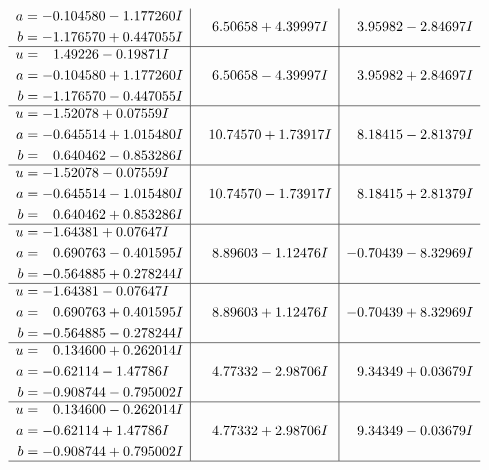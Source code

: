 \documentclass[1p]{elsarticle_modified}
\theoremstyle{definition}
\begin{document}
$$\begin{array}{c|c|c}
\begin{aligned}
a &= -0.104580 - 1.177260 I \\
b &= -1.176570 + 0.447055 I\end{aligned}
 & \phantom{-}6.50658 + 4.39997 I & \phantom{-}3.95982 - 2.84697 I \\ \hline\begin{aligned}
u &= \phantom{-}1.49226 - 0.19871 I \\
a &= -0.104580 + 1.177260 I \\
b &= -1.176570 - 0.447055 I\end{aligned}
 & \phantom{-}6.50658 - 4.39997 I & \phantom{-}3.95982 + 2.84697 I \\ \hline\begin{aligned}
u &= -1.52078 + 0.07559 I \\
a &= -0.645514 + 1.015480 I \\
b &= \phantom{-}0.640462 - 0.853286 I\end{aligned}
 & \phantom{-}10.74570 + 1.73917 I & \phantom{-}8.18415 - 2.81379 I \\ \hline\begin{aligned}
u &= -1.52078 - 0.07559 I \\
a &= -0.645514 - 1.015480 I \\
b &= \phantom{-}0.640462 + 0.853286 I\end{aligned}
 & \phantom{-}10.74570 - 1.73917 I & \phantom{-}8.18415 + 2.81379 I \\ \hline\begin{aligned}
u &= -1.64381 + 0.07647 I \\
a &= \phantom{-}0.690763 - 0.401595 I \\
b &= -0.564885 + 0.278244 I\end{aligned}
 & \phantom{-}8.89603 - 1.12476 I & -0.70439 - 8.32969 I \\ \hline\begin{aligned}
u &= -1.64381 - 0.07647 I \\
a &= \phantom{-}0.690763 + 0.401595 I \\
b &= -0.564885 - 0.278244 I\end{aligned}
 & \phantom{-}8.89603 + 1.12476 I & -0.70439 + 8.32969 I \\ \hline\begin{aligned}
u &= \phantom{-}0.134600 + 0.262014 I \\
a &= -0.62114 - 1.47786 I \\
b &= -0.908744 - 0.795002 I\end{aligned}
 & \phantom{-}4.77332 - 2.98706 I & \phantom{-}9.34349 + 0.03679 I \\ \hline\begin{aligned}
u &= \phantom{-}0.134600 - 0.262014 I \\
a &= -0.62114 + 1.47786 I \\
b &= -0.908744 + 0.795002 I\end{aligned}
 & \phantom{-}4.77332 + 2.98706 I & \phantom{-}9.34349 - 0.03679 I\\
 \hline 
 \end{array}$$\newpage
\end{document}
